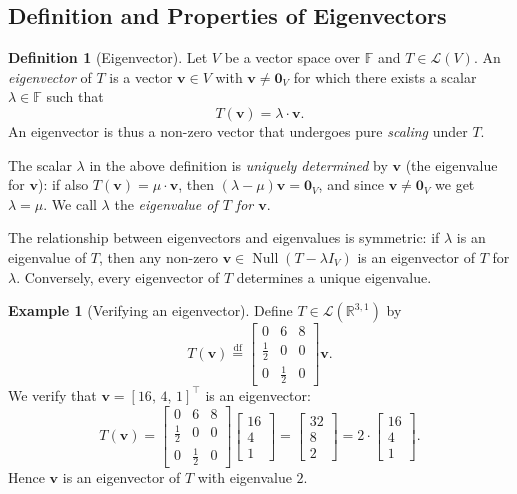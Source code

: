 \documentclass[11pt, a4paper, notitlepage]{report}
\theoremstyle{definition}
\newtheorem{definition}[theorem]{Definition}
\newtheorem{example}[theorem]{Example}
\theoremstyle{remark}
\begin{document}
\subsection{Definition and Properties of Eigenvectors}

\begin{definition}[Eigenvector]\label{def:eigenvector}
Let $V$ be a vector space over $\mathbb{F}$ and $T \in \mathcal{L}(V)$. An
\emph{eigenvector} of $T$ is a vector $\mathbf{v} \in V$ with $\mathbf{v} \neq \mathbf{0}_V$
for which there exists a scalar $\lambda \in \mathbb{F}$ such that
\[
  T(\mathbf{v}) = \lambda \cdot \mathbf{v}.
\]
An eigenvector is thus a non-zero vector that undergoes pure \emph{scaling} under $T$.
\end{definition}

The scalar $\lambda$ in the above definition is \emph{uniquely determined} by $\mathbf{v}$
(the eigenvalue for $\mathbf{v}$): if also $T(\mathbf{v}) = \mu \cdot \mathbf{v}$, then
$(\lambda - \mu)\mathbf{v} = \mathbf{0}_V$, and since $\mathbf{v} \neq \mathbf{0}_V$ we
get $\lambda = \mu$. We call $\lambda$ the \emph{eigenvalue of $T$ for $\mathbf{v}$}.

The relationship between eigenvectors and eigenvalues is symmetric: if $\lambda$ is an
eigenvalue of $T$, then any non-zero $\mathbf{v} \in \operatorname{Null}(T - \lambda I_V)$
is an eigenvector of $T$ for $\lambda$. Conversely, every eigenvector of $T$ determines a
unique eigenvalue.

\begin{example}[Verifying an eigenvector]\label{ex:eigenvector-verify}
Define $T \in \mathcal{L}(\mathbb{R}^{3,1})$ by
\[
  T(\mathbf{v}) \stackrel{\mathrm{df}}{=}
  \begin{bmatrix} 0 & 6 & 8 \\ \tfrac{1}{2} & 0 & 0 \\ 0 & \tfrac{1}{2} & 0 \end{bmatrix}\mathbf{v}.
\]
We verify that $\mathbf{v} = [16,\,4,\,1]^{\top}$ is an eigenvector:
\[
  T(\mathbf{v}) =
  \begin{bmatrix}0&6&8\\\tfrac{1}{2}&0&0\\0&\tfrac{1}{2}&0\end{bmatrix}
  \begin{bmatrix}16\\4\\1\end{bmatrix}
  = \begin{bmatrix}32\\8\\2\end{bmatrix}
  = 2 \cdot \begin{bmatrix}16\\4\\1\end{bmatrix}.
\]
Hence $\mathbf{v}$ is an eigenvector of $T$ with eigenvalue $2$.
\end{example}
\end{document}
